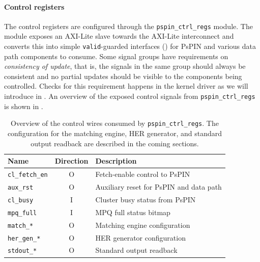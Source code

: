 \paragraph{Control registers} The control registers are configured through the \texttt{pspin\_\-ctrl\_\-regs} module.  The module exposes an AXI-Lite slave towards the AXI-Lite interconnect and converts this into simple \texttt{valid}-guarded interfaces () for PsPIN and various data path components to consume.  Some signal groups have requirements on \emph{consistency of update}, that is, the signals in the same group should always be consistent and no partial updates should be visible to the components being controlled.  Checks for this requirement happens in the kernel driver as we will introduce in .  An overview of the exposed control signals from \texttt{pspin\_\-ctrl\_\-regs} is shown in .

\begin{table}[ht]
    \centering
    \begin{tabular}{lcl}
    \toprule
    Name & Direction & Description \\ \midrule
    \texttt{cl\_fetch\_en} & O & Fetch-enable control to PsPIN \\
    \texttt{aux\_rst} & O & Auxiliary reset for PsPIN and data path \\
    \texttt{cl\_busy} & I & Cluster busy status from PsPIN \\
    \texttt{mpq\_full} & I & MPQ full status bitmap \\
    \texttt{match\_*} & O & Matching engine configuration \\
    \texttt{her\_gen\_*} & O & HER generator configuration \\
    \texttt{stdout\_*} & O & Standard output readback \\
    \bottomrule
    \end{tabular}
    \caption{Overview of the control wires consumed by \texttt{pspin\_ctrl\_regs}.  The configuration for the matching engine, HER generator, and standard output readback are described in the coming sections.  }
    \label{tab:ctrl-signals}
\end{table}

